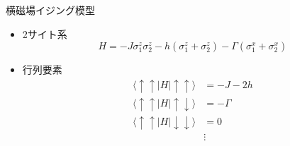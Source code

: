 \begin{frame}[t,fragile]{横磁場イジング模型}
  \begin{itemize}
  \item 2サイト系
    \[
      H = -J \sigma_1^z \sigma_2^z - h (\sigma_1^z + \sigma_2^z) - \Gamma (\sigma_1^x + \sigma_2^x)
    \]
  \item 行列要素
    \begin{align*}
      \langle \uparrow \uparrow \!| H |\! \uparrow \uparrow \rangle &= -J - 2h \\
      \langle \uparrow \uparrow \!| H |\! \uparrow \downarrow \rangle &= -\Gamma \\
      \langle \uparrow \uparrow \!| H |\! \downarrow \downarrow \rangle &= 0 \\
      &\vdots
    \end{align*}
  \end{itemize}
\end{frame}
